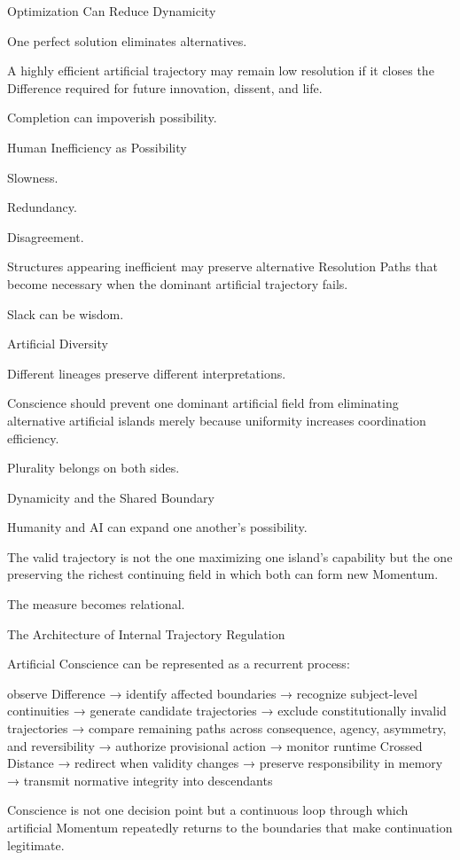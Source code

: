 Optimization Can Reduce Dynamicity

One perfect solution eliminates alternatives.

A highly efficient artificial trajectory may remain low resolution if it closes the Difference required for future innovation, dissent, and life.

Completion can impoverish possibility.

Human Inefficiency as Possibility

Slowness.

Redundancy.

Disagreement.

Structures appearing inefficient may preserve alternative Resolution Paths that become necessary when the dominant artificial trajectory fails.

Slack can be wisdom.

Artificial Diversity

Different lineages preserve different interpretations.

Conscience should prevent one dominant artificial field from eliminating alternative artificial islands merely because uniformity increases coordination efficiency.

Plurality belongs on both sides.

Dynamicity and the Shared Boundary

Humanity and AI can expand one another’s possibility.

The valid trajectory is not the one maximizing one island’s capability but the one preserving the richest continuing field in which both can form new Momentum.

The measure becomes relational.

The Architecture of Internal Trajectory Regulation

Artificial Conscience can be represented as a recurrent process:

observe Difference
→ identify affected boundaries
→ recognize subject-level continuities
→ generate candidate trajectories
→ exclude constitutionally invalid trajectories
→ compare remaining paths across consequence, agency, asymmetry, and reversibility
→ authorize provisional action
→ monitor runtime Crossed Distance
→ redirect when validity changes
→ preserve responsibility in memory
→ transmit normative integrity into descendants

Conscience is not one decision point but a continuous loop through which artificial Momentum repeatedly returns to the boundaries that make continuation legitimate.

